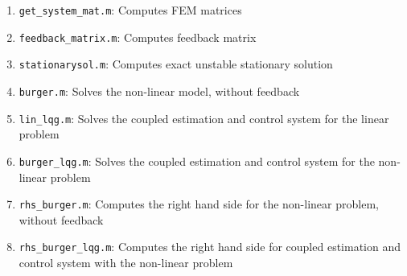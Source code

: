 \documentclass[12pt]{article}
\begin{document}
\begin{enumerate}

\item {\tt get\_system\_mat.m}: Computes FEM matrices

\item {\tt feedback\_matrix.m}: Computes feedback matrix

\item {\tt stationarysol.m}: Computes exact unstable stationary solution

\item {\tt burger.m}: Solves the non-linear model, without feedback

\item {\tt lin\_lqg.m}: Solves the coupled estimation and control system for the linear problem

\item {\tt burger\_lqg.m}: Solves the coupled estimation and control system for the non-linear problem

\item {\tt rhs\_burger.m}: Computes the right hand side for the non-linear problem, without feedback

\item {\tt rhs\_burger\_lqg.m}: Computes the right hand side for coupled estimation and control system with the non-linear problem

\end{enumerate}
\end{document}
